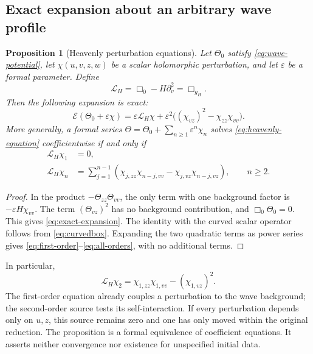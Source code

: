 \documentclass[11pt]{article}
\numberwithin{equation}{section}
\newtheorem{proposition}[theorem]{Proposition}
\theoremstyle{definition}
\theoremstyle{remark}
\begin{document}
\subsection{Exact expansion about an arbitrary wave profile}

\begin{proposition}[Heavenly perturbation equations]\label{prop:perturbation}
Let $\Theta_0$ satisfy \eqref{eq:wave-potential}, let $\chi(u,v,z,w)$ be a scalar holomorphic perturbation, and let $\varepsilon$ be a formal parameter. Define
\begin{equation}\label{eq:linearized-heavenly}
\mathcal L_H=\Box_0-H\partial_v^2=\Box_{g_H}.
\end{equation}
Then the following expansion is exact:
\begin{equation}\label{eq:exact-expansion}
\mathcal E(\Theta_0+\varepsilon\chi)
=\varepsilon\mathcal L_H\chi
+\varepsilon^2\bigl((\chi_{vz})^2-\chi_{zz}\chi_{vv}\bigr).
\end{equation}
More generally, a formal series $\Theta=\Theta_0+\sum_{n\geq1}\varepsilon^n\chi_n$ solves \eqref{eq:heavenly-equation} coefficientwise if and only if
\begin{align}
\mathcal L_H\chi_1&=0,
\label{eq:first-order}\\
\mathcal L_H\chi_n&=\sum_{j=1}^{n-1}
\left(\chi_{j,zz}\chi_{n-j,vv}-\chi_{j,vz}\chi_{n-j,vz}\right),
\qquad n\geq2.
\label{eq:all-orders}
\end{align}
\end{proposition}
\begin{proof}
In the product $-\Theta_{zz}\Theta_{vv}$, the only term with one background factor is $-\varepsilon H\chi_{vv}$. The term $(\Theta_{vz})^2$ has no background contribution, and $\Box_0\Theta_0=0$. This gives \eqref{eq:exact-expansion}. The identity with the curved scalar operator follows from \eqref{eq:curvedbox}. Expanding the two quadratic terms as power series gives \eqref{eq:first-order}--\eqref{eq:all-orders}, with no additional terms.
\end{proof}

In particular,
\begin{equation}\label{eq:second-order}
\mathcal L_H\chi_2=\chi_{1,zz}\chi_{1,vv}-(\chi_{1,vz})^2.
\end{equation}
The first-order equation already couples a perturbation to the wave background; the second-order source tests its self-interaction. If every perturbation depends only on $u,z$, this source remains zero and one has only moved within the original reduction. The proposition is a formal equivalence of coefficient equations. It asserts neither convergence nor existence for unspecified initial data.
\end{document}
